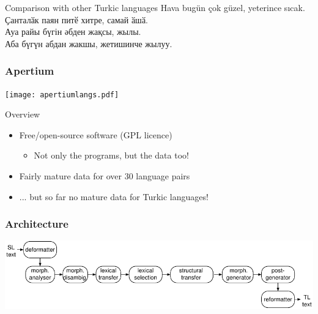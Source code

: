 \documentclass[10pt,xetex]{beamer} %
\begin{document}
\begin{frame}
\begin{onlyenv}
    \begin{block}{Comparison with other Turkic languages}
      Hava bugün çok güzel, yeterince sıcak. \\
      Ҫанталӑк паян питӗ хитре, самай ӑшӑ. \\
      Ауа райы бүгін әбден жақсы, жылы. \\
      Аба бүгүн абдан жакшы, жетишинче жылуу. 
    \end{block}
  
  \end{onlyenv}
  
\end{frame}

\begin{frame}
  \frametitle{Apertium}

\begin{center}
  \texttt{[image: apertiumlangs.pdf]}%
\end{center}
\begin{block}{Overview}
  
  \begin{itemize}
    \item Free/open-source software (GPL licence)
    \begin{itemize}
      \item Not only the programs, but the data too!
    \end{itemize}
    \item Fairly mature data for over 30 language pairs
    \item ... but so far no mature data for Turkic languages!
  \end{itemize}
  
\end{block}


\end{frame}

\begin{frame}
  \frametitle{Architecture}

\includegraphics[width=\textwidth]{../architecture.pdf}

\end{frame}
\end{document}
